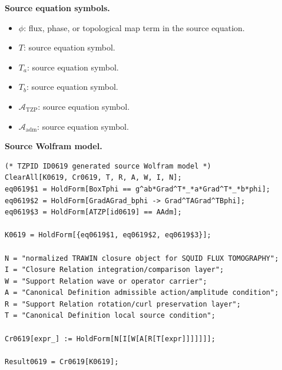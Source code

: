 \begin{minipage}[t]{0.49\linewidth}
\begingroup
\small
\raggedright
\textbf{Source equation symbols.}\par
\begin{itemize}[leftmargin=1.35em,itemsep=1pt,topsep=1pt,parsep=0pt]
    \item $\phi$: flux, phase, or topological map term in the source equation.
    \item $T$: source equation symbol.
    \item $T_a$: source equation symbol.
    \item $T_b$: source equation symbol.
    \item $\mathcal{A}_{\mathrm{TZP}}$: source equation symbol.
    \item $\mathcal{A}_{\mathrm{adm}}$: source equation symbol.
\end{itemize}
\endgroup
\end{minipage}\hfill
\begin{minipage}[t]{0.47\linewidth}
\begingroup
\scriptsize
\raggedright
\textbf{Source Wolfram model.}\par
\begin{Verbatim}[fontsize=\tiny,breaklines=true,breakanywhere=true]
(* TZPID ID0619 generated source Wolfram model *)
ClearAll[K0619, Cr0619, T, R, A, W, I, N];
eq0619$1 = HoldForm[BoxTphi == g^ab*Grad^T*_*a*Grad^T*_*b*phi];
eq0619$2 = HoldForm[GradAGrad_bphi -> Grad^TAGrad^TBphi];
eq0619$3 = HoldForm[ATZP[id0619] == AAdm];

K0619 = HoldForm[{eq0619$1, eq0619$2, eq0619$3}];

N = "normalized TRAWIN closure object for SQUID FLUX TOMOGRAPHY";
I = "Closure Relation integration/comparison layer";
W = "Support Relation wave or operator carrier";
A = "Canonical Definition admissible action/amplitude condition";
R = "Support Relation rotation/curl preservation layer";
T = "Canonical Definition local source condition";

Cr0619[expr_] := HoldForm[N[I[W[A[R[T[expr]]]]]]];

Result0619 = Cr0619[K0619];
\end{Verbatim}
\endgroup
\end{minipage}

